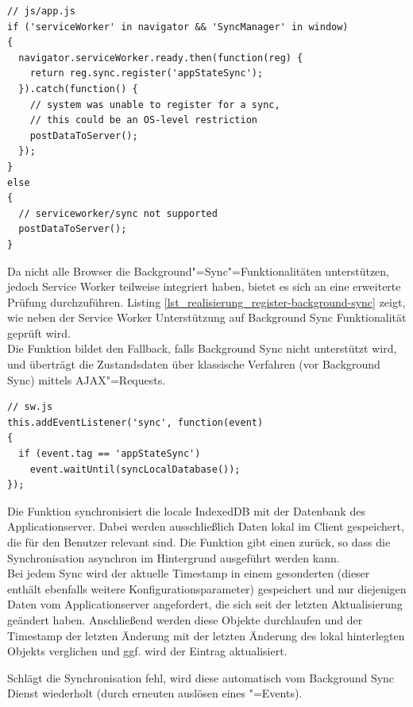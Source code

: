 \begin{lstlisting}[caption={Registrierung Background Sync},label={lst_realisierung_register-background-sync}, frame=single]
// js/app.js
if ('serviceWorker' in navigator && 'SyncManager' in window) 
{
  navigator.serviceWorker.ready.then(function(reg) {
    return reg.sync.register('appStateSync');
  }).catch(function() {
    // system was unable to register for a sync,
    // this could be an OS-level restriction
    postDataToServer();
  });
}
else 
{
  // serviceworker/sync not supported
  postDataToServer();
}
\end{lstlisting}

Da nicht alle Browser die Background"=Sync"=Funktionalitäten unterstützen, jedoch Service Worker teilweise integriert haben, bietet es sich an eine erweiterte Prüfung durchzuführen. Listing \ref{lst_realisierung_register-background-sync} zeigt, wie neben der Service Worker Unterstützung auf Background Sync Funktionalität geprüft wird. \\
Die Funktion  bildet den Fallback, falls Background Sync nicht unterstützt wird, und überträgt die Zustandsdaten über \glqq klassische\grqq{} Verfahren (vor Background Sync) mittels AJAX"=Requests.\\

\begin{lstlisting}[caption={\code{sync}"=EventListener in der Service Worker Konfigurationsdatei},label={lst_realisierung_sw-background-sync}, frame=single]
// sw.js
this.addEventListener('sync', function(event) 
{
  if (event.tag == 'appStateSync') 
    event.waitUntil(syncLocalDatabase());
});
\end{lstlisting}

Die Funktion  synchronisiert die locale IndexedDB mit der Datenbank des Applicationserver. Dabei werden ausschließlich Daten lokal im Client gespeichert, die für den Benutzer relevant sind. Die Funktion gibt einen  zurück, so dass die Synchronisation asynchron im Hintergrund ausgeführt werden kann. \\
Bei jedem Sync wird der aktuelle Timestamp in einem gesonderten  (dieser enthält ebenfalls weitere Konfigurationsparameter) gespeichert und nur diejenigen Daten vom Applicationserver angefordert, die sich seit der letzten Aktualisierung geändert haben. Anschließend werden diese Objekte durchlaufen und der Timestamp der letzten Änderung mit der letzten Änderung des lokal hinterlegten Objekts verglichen und ggf. wird der Eintrag aktualisiert.

Schlägt die Synchronisation fehl, wird diese automatisch vom Background Sync Dienst wiederholt (durch erneuten auslösen eines "=Events).